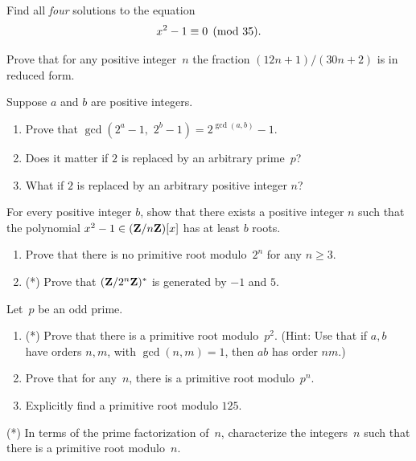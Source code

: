 \begin{exercises}
\item\label{ex:solnsqrtmod35} Find all {\em four} solutions to the equation
$$
  x^2 - 1\equiv 0 \pmod{35}.
$$

\item\label{ex:reducedfraction}
Prove that for any positive integer~$n$ the fraction
  $(12n+1)/(30n+2)$ is in reduced form.


\item\label{ex:gcd2} Suppose $a$ and $b$ are positive integers.
\begin{enumerate}
\item Prove that
$\gcd(2^a-1,\,\, 2^b-1) = 2^{\gcd(a,b)}-1.$
\item Does it matter if $2$ is replaced by an arbitrary prime~$p$?
\item What if $2$ is replaced by an arbitrary positive integer $n$?
\end{enumerate}

\item
For every positive integer $b$, show that there exists a positive
integer $n$ such that the polynomial $x^2-1\in(\mathbf{Z}/n\mathbf{Z}{})[x]$
has at least $b$ roots.

\item\label{ex:prim1}
\begin{enumerate}
\item Prove that there is no primitive root
modulo~$2^n$ for any $n\geq 3$.
\item (*) Prove that $(\mathbf{Z}/2^n\mathbf{Z}{})^*$ is generated by $-1$ and $5$.
\end{enumerate}

\item\label{ex:prim2}
Let~$p$ be an odd prime.
\begin{enumerate}
\item (*) Prove that there is a primitive root modulo~$p^2$.
(Hint: Use that if $a, b$
      have orders $n, m$, with $\gcd(n,m)=1$, then $ab$ has order $nm$.)
\item Prove that for any~$n$, there is a primitive root modulo~$p^n$.
\item Explicitly find a primitive root modulo $125$.
\end{enumerate}

 \item \label{ex:prim_fac}(*)
 In terms of the prime factorization of~$n$, characterize the
 integers~$n$ such that there is a primitive root modulo~$n$.


\end{exercises}
